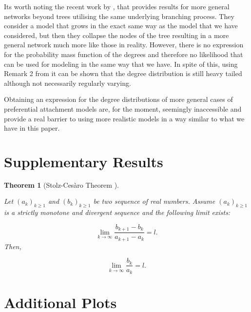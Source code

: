 \documentclass[
  sn-basic,
]{sn-jnl}
\theoremstyle{plain}
\theoremstyle{plain}
\newtheorem{theorem}{Theorem}[section]
\theoremstyle{remark}
\begin{document}
Its worth noting the recent work by \citet{banerjee25}, that provides
results for more general networks beyond trees utilising the same
underlying branching process. They consider a model that grows in the
exact same way as the model that we have considered, but then they
collapse the nodes of the tree resulting in a more general network much
more like those in reality. However, there is no expression for the
probability mass function of the degrees and therefore no likelihood
that can be used for modeling in the same way that we have. In spite of
this, using Remark 2 from \citet{banerjee25} it can be shown that the
degree distribution is still heavy tailed although not necessarily
regularly varying.

Obtaining an expression for the degree distributions of more general
cases of preferential attachment models are, for the moment, seemingly
inaccessible and provide a real barrier to using more realistic models
in a way similar to what we have in this paper.

\setcounter{section}{0}
\renewcommand{\thesection}{\Alph{section}}
\setcounter{table}{0}
\renewcommand{\thetable}{A\arabic{table}}
\setcounter{figure}{0}
\renewcommand{\thefigure}{A\arabic{figure}}

\newpage

\section{Supplementary Results}\label{sec-sup}

\begin{theorem}[Stolz-Cesàro Theorem
\citep{cesaro}]\protect\hypertarget{thm-stolz}{}\label{thm-stolz}

Let \((a_k)_{k\ge1}\) and \((b_k)_{k\ge1}\) be two sequence of real
numbers. Assume \((a_k)_{k\ge1}\) is a strictly monotone and divergent
sequence and the following limit exists:

\[
\lim_{k\rightarrow\infty}\frac{b_{k+1} - b_k}{a_{k+1} - a_k} = l.
\] Then,

\[
\lim_{k\rightarrow\infty}\frac{b_k}{a_k} = l.
\]

\end{theorem}

\section{Additional Plots}\label{additional-plots}
\end{document}
